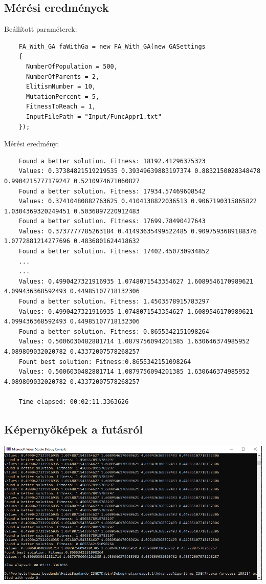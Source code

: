 \documentclass{article}
\begin{document}
  \subsection{Mérési eredmények}
  Beállított paraméterek:
  \begin{lstlisting}
    FA_With_GA faWithGa = new FA_With_GA(new GASettings
    {
      NumberOfPopulation = 500,
      NumberOfParents = 2,
      ElitismNumber = 10,
      MutationPercent = 5,
      FitnessToReach = 1,
      InputFilePath = "Input/FuncAppr1.txt"
    });
  \end{lstlisting}
  Mérési eredmény:
  \begin{lstlisting}
    Found a better solution. Fitness: 18192.41296375323
    Values: 0.37384821519219535 0.39349639883197374 0.8832150028348478 0.9904215777179247 0.5210974671060827
    Found a better solution. Fitness: 17934.57469608542
    Values: 0.37410480882763625 0.4104138822036513 0.9067190315865822 1.0304369320249451 0.5036897220912483
    Found a better solution. Fitness: 17699.78490427643
    Values: 0.3737777785263184 0.41493635499522485 0.9097593689188376 1.0772881214277696 0.4836801624418632
    Found a better solution. Fitness: 17402.450730934852
    ...
    ...
    Values: 0.4990427321916935 1.0748071543354627 1.6089546170989621 4.099436368592493 0.44985107718132306
    Found a better solution. Fitness: 1.4503578915783297
    Values: 0.4990427321916935 1.0748071543354627 1.6089546170989621 4.099436368592493 0.44985107718132306
    Found a better solution. Fitness: 0.8655342151098264
    Values: 0.5006030482881714 1.0879756094201385 1.630646374985952 4.089809032020782 0.43372007578268257
    Fount best solution: Fitness:0.8655342151098264
    Values: 0.5006030482881714 1.0879756094201385 1.630646374985952 4.089809032020782 0.43372007578268257

    Time elapsed: 00:02:11.3363626
  \end{lstlisting}
  \subsection{Képernyőképek a futásról}
  \includegraphics[width=1.0\textwidth]{genetic}
\end{document}

